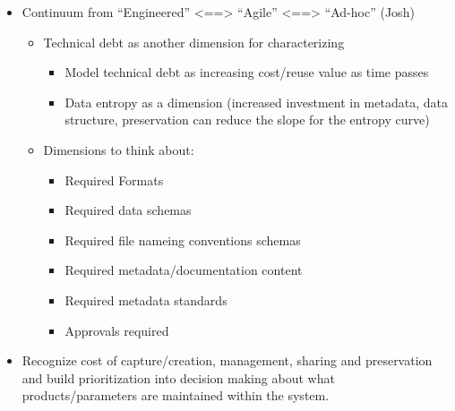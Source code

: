 \documentclass[paper]{ijdc-v9}
\begin{document}
\begin{itemize}
\itemsep1pt\parskip0pt
\item
  Continuum from ``Engineered'' \textless{}==\textgreater{} ``Agile''
  \textless{}==\textgreater{} ``Ad-hoc'' (Josh)

  \begin{itemize}
  \itemsep1pt\parskip0pt
  \item
    Technical debt as another dimension for characterizing

    \begin{itemize}
    \itemsep1pt\parskip0pt
    \item
      Model technical debt as increasing cost/reuse value as time passes
    \item
      Data entropy as a dimension (increased investment in metadata,
      data structure, preservation can reduce the slope for the entropy
      curve)
    \end{itemize}
  \item
    Dimensions to think about:

    \begin{itemize}
    \itemsep1pt\parskip0pt
    \item
      Required Formats
    \item
      Required data schemas
    \item
      Required file nameing conventions schemas
    \item
      Required metadata/documentation content
    \item
      Required metadata standards
    \item
      Approvals required
    \end{itemize}
  \end{itemize}
\item
  Recognize cost of capture/creation, management, sharing and
  preservation and build prioritization into decision making about what
  products/parameters are maintained within the system.
\end{itemize}
\end{document}
